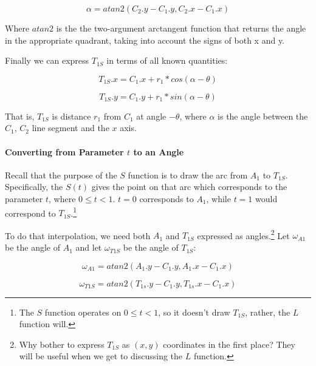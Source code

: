 \documentclass{article}
\begin{document}
\begin{equation}
    \label{eq:alpha}
    \alpha = atan2(C_2.y - C_1.y, C_2.x - C_1.x)
\end{equation}

Where $atan2$ is the the two-argument arctangent function that returns the angle in the appropriate quadrant, taking into account the signs of both x and y.

Finally we can express $T_{1S}$ in terms of all known quantities:

\begin{equation}
    \label{eq:T_1S.x}
    T_{1S}.x = C_1.x + r_1 * cos(\alpha - \theta)
\end{equation}

\begin{equation}
    \label{eq:T_1S.y}
    T_{1S}.y = C_1.y + r_1 * sin(\alpha - \theta)
\end{equation}

That is, $T_{1S}$ is distance $r_1$ from $C_1$ at angle $-\theta$, where $\alpha$ is the angle between the $C_1$, $C_2$ line segment and the $x$ axis.

\paragraph{Converting from Parameter $t$ to an Angle}
Recall that the purpose of the $S$ function is to draw the arc from $A_1$ to $T_{1S}$. Specifically, the $S(t)$ gives the point on that arc which corresponds to the parameter $t$, where $0 \leq t < 1$. $t = 0$ corresponds to $A_1$, while $t = 1$ would correspond to $T_{1S}$.\footnote{The $S$ function operates on $0 \leq t < 1$, so it doesn't draw $T_{1S}$, rather, the $L$ function will.}

To do that interpolation, we need both $A_1$ and $T_{1S}$ expressed as angles.\footnote{Why bother to express $T_{1S}$ as $(x,y)$ coordinates in the first place? They will be useful when we get to discussing the $L$ function.} Let $\omega_{A1}$ be the angle of $A_1$ and let $\omega_{T1S}$ be the angle of $T_{1S}$:

\begin{equation}
    \label{eq:omega_A1}
    \omega_{A1} = atan2(A_1.y - C_1.y, A_1.x - C_1.x)
\end{equation}

\begin{equation}
    \label{eq:omega_T1S}
    \omega_{T1S} = atan2(T_{1s}.y - C_1.y, T_{1s}.x - C_1.x)
\end{equation}
\end{document}
